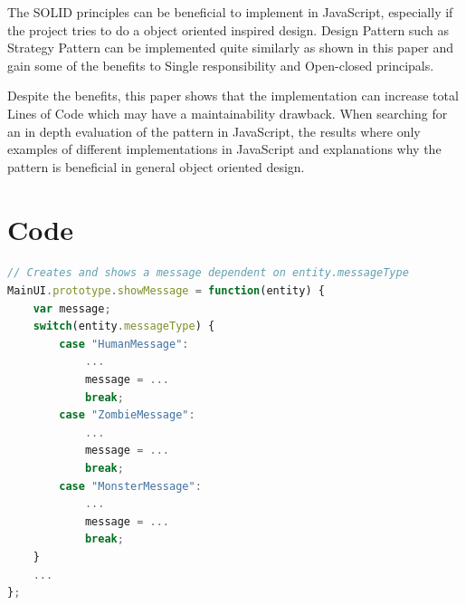 \documentclass[conference, a4paper]{IEEEtran}
\begin{document}
The SOLID principles can be beneficial to implement in JavaScript, especially if the project tries to do a object oriented inspired design. Design Pattern such as Strategy Pattern can be implemented quite similarly as shown in this paper and gain some of the benefits to Single responsibility and Open-closed principals.

Despite the benefits, this paper shows that the implementation can increase total Lines of Code which may have a maintainability drawback. When searching for an in depth evaluation of the pattern in JavaScript, the results where only examples of different implementations in JavaScript and explanations why the pattern is beneficial in general object oriented design.

\clearpage
\section*{Code}

\begin{lstlisting}[language=JavaScript, label=lst:switch-case, caption=\texttt{MainUI.js} The original switch case.]
// Creates and shows a message dependent on entity.messageType
MainUI.prototype.showMessage = function(entity) {
	var message;
	switch(entity.messageType) {
		case "HumanMessage":
			...
			message = ...
			break;
		case "ZombieMessage":
			...
			message = ...
			break;
		case "MonsterMessage":
			...
			message = ...
			break;
	}
	...
};
\end{lstlisting}
\end{document}
